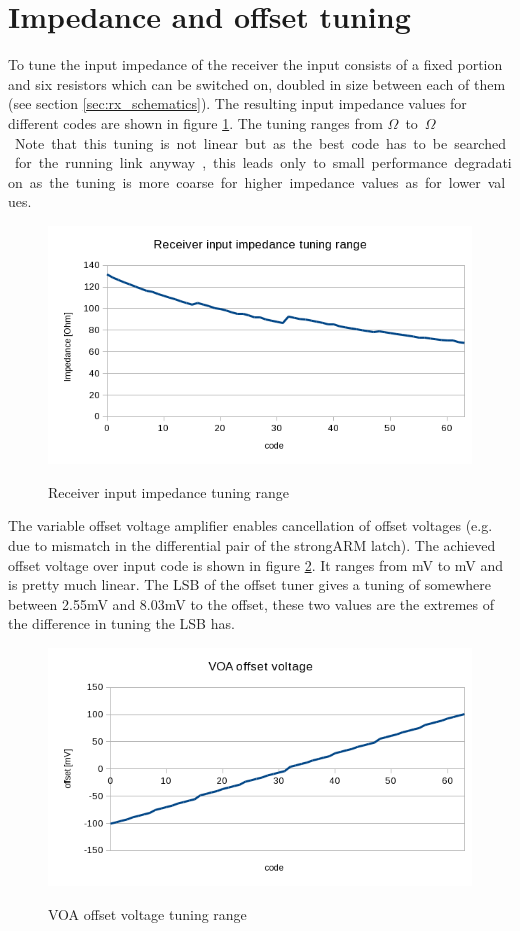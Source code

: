 \section{Impedance and offset tuning}

To tune the input impedance of the receiver the input consists of a fixed portion and six resistors which can be switched on, doubled in size between each of them (see section \ref{sec:rx_schematics}). The resulting input impedance values for different codes are shown in figure \ref{fig:rx_imp_tuning_range}. The tuning ranges from \unit[70]{$\Omega$} to \unit[130]{$\Omega$}. Note that this tuning is not linear but as the best code has to be searched for the running link anyway, this leads only to small performance degradation as the tuning is more coarse for higher impedance values as for lower values.

\begin{figure}[H]
  \centering
  {\includegraphics[scale=0.9]{plots/rx_inp_imp.png}}
  \caption{Receiver input impedance tuning range}
  \label{fig:rx_imp_tuning_range}
\end{figure}

The variable offset voltage amplifier enables cancellation of offset voltages (e.g. due to mismatch in the differential pair of the strongARM latch). The achieved offset voltage over input code is shown in figure \ref{fig:voa_offset}. It ranges from \unit[-100]{mV} to \unit[100]{mV} and is pretty much linear. The LSB of the offset tuner gives a tuning of somewhere between 2.55mV and 8.03mV to the offset, these two values are the extremes of the difference in tuning the LSB has.

\begin{figure}[H]
  \centering
  {\includegraphics[scale=0.9]{plots/voa_offset.png}}
  \caption{VOA offset voltage tuning range}
  \label{fig:voa_offset}
\end{figure}
